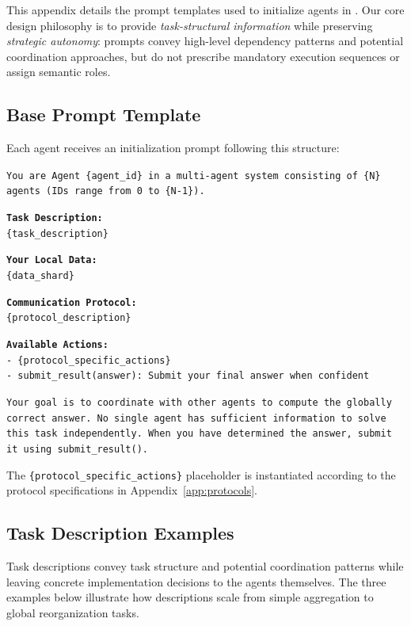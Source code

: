 This appendix details the prompt templates used to initialize agents in \silobench{}. Our core design philosophy is to provide \textit{task-structural information} while preserving \textit{strategic autonomy}: prompts convey high-level dependency patterns and potential coordination approaches, but do not prescribe mandatory execution sequences or assign semantic roles.

\subsection{Base Prompt Template}

Each agent receives an initialization prompt following this structure:

\begin{tcolorbox}[colback=lightblue!10, colframe=black!50, title=Agent Initialization Prompt]
\small
\texttt{You are Agent \{agent\_id\} in a multi-agent system consisting of \{N\} agents (IDs range from 0 to \{N-1\}).}

\texttt{\textbf{Task Description:}}\\
\texttt{\{task\_description\}}

\texttt{\textbf{Your Local Data:}}\\
\texttt{\{data\_shard\}}

\texttt{\textbf{Communication Protocol:}}\\
\texttt{\{protocol\_description\}}

\texttt{\textbf{Available Actions:}}\\
\texttt{- \{protocol\_specific\_actions\}}\\
\texttt{- submit\_result(answer): Submit your final answer when confident}

\texttt{Your goal is to coordinate with other agents to compute the globally correct answer. No single agent has sufficient information to solve this task independently. When you have determined the answer, submit it using submit\_result().}
\end{tcolorbox}

The \texttt{\{protocol\_specific\_actions\}} placeholder is instantiated according to the protocol specifications in Appendix~\ref{app:protocols}.

\subsection{Task Description Examples}

Task descriptions convey task structure and potential coordination patterns while leaving concrete implementation decisions to the agents themselves. The three examples below illustrate how descriptions scale from simple aggregation to global reorganization tasks.

